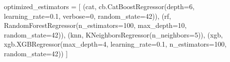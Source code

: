 \documentclass[
  letterpaper,
  DIV=11,
  numbers=noendperiod]{scrreprt}
\newenvironment{Shaded}{\begin{snugshade}}{\end{snugshade}}
\newcommand{\DecValTok}[1]{\textcolor[rgb]{0.68,0.00,0.00}{#1}}
\newcommand{\FloatTok}[1]{\textcolor[rgb]{0.68,0.00,0.00}{#1}}
\newcommand{\NormalTok}[1]{\textcolor[rgb]{0.00,0.23,0.31}{#1}}
\newcommand{\OperatorTok}[1]{\textcolor[rgb]{0.37,0.37,0.37}{#1}}
\newcommand{\StringTok}[1]{\textcolor[rgb]{0.13,0.47,0.30}{#1}}
\begin{document}
\begin{Shaded}
\begin{Highlighting}[]
\NormalTok{optimized\_estimators }\OperatorTok{=}\NormalTok{ [}
\NormalTok{    (}\StringTok{\textquotesingle{}cat\textquotesingle{}}\NormalTok{, cb.CatBoostRegressor(depth}\OperatorTok{=}\DecValTok{6}\NormalTok{, learning\_rate}\OperatorTok{=}\FloatTok{0.1}\NormalTok{, verbose}\OperatorTok{=}\DecValTok{0}\NormalTok{, random\_state}\OperatorTok{=}\DecValTok{42}\NormalTok{)),}
\NormalTok{    (}\StringTok{\textquotesingle{}rf\textquotesingle{}}\NormalTok{, RandomForestRegressor(n\_estimators}\OperatorTok{=}\DecValTok{100}\NormalTok{, max\_depth}\OperatorTok{=}\DecValTok{10}\NormalTok{, random\_state}\OperatorTok{=}\DecValTok{42}\NormalTok{)),}
\NormalTok{    (}\StringTok{\textquotesingle{}knn\textquotesingle{}}\NormalTok{, KNeighborsRegressor(n\_neighbors}\OperatorTok{=}\DecValTok{5}\NormalTok{)),}
\NormalTok{    (}\StringTok{\textquotesingle{}xgb\textquotesingle{}}\NormalTok{, xgb.XGBRegressor(max\_depth}\OperatorTok{=}\DecValTok{4}\NormalTok{, learning\_rate}\OperatorTok{=}\FloatTok{0.1}\NormalTok{, n\_estimators}\OperatorTok{=}\DecValTok{100}\NormalTok{, random\_state}\OperatorTok{=}\DecValTok{42}\NormalTok{))}
\NormalTok{]}
\end{Highlighting}
\end{Shaded}
\end{document}
